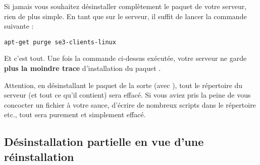 Si jamais vous souhaitez désinstaller complètement le paquet 
de votre serveur, rien de plus simple. En tant que  sur le serveur,
il suffit de lancer la commande suivante :
%
\begin{lstlisting}
apt-get purge se3-clients-linux
\end{lstlisting}
%
Et c'est tout. Une fois la commande ci-dessus exécutée,
votre serveur ne garde \textbf{plus la moindre trace} d'installation du
paquet .

\begin{alerte}
Attention, en désinstallant le paquet de la sorte (avec ),
tout le répertoire 
du serveur (et tout ce qu'il contient) sera effacé.
Si vous aviez pris la peine de vous concocter un fichier
 à votre sauce, d'écrire de nombreux
scripts dans le répertoire  etc., tout sera
purement et simplement effacé.
\end{alerte}

\subsection{Désinstallation partielle en vue d'une réinstallation}
\label{reinstallation}


